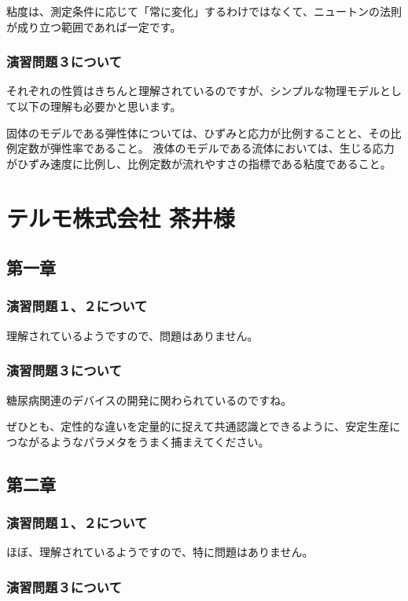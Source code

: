\documentclass[uplatex,dvipdfmx,a4paper,11pt]{jsreport}
\begin{document}
粘度は、測定条件に応じて「常に変化」するわけではなくて、ニュートンの法則が成り立つ範囲であれば一定です。

\subsubsection*{演習問題３について}
それぞれの性質はきちんと理解されているのですが、シンプルな物理モデルとして以下の理解も必要かと思います。

固体のモデルである弾性体については、ひずみと応力が比例することと、その比例定数が弾性率であること。
液体のモデルである流体においては、生じる応力がひずみ速度に比例し、比例定数が流れやすさの指標である粘度であること。

\clearpage

\section*{テルモ株式会社 茶井様}
\subsection*{第一章}
\subsubsection*{演習問題１、２について}
理解されているようですので、問題はありません。

\subsubsection*{演習問題３について}

糖尿病関連のデバイスの開発に関わられているのですね。

ぜひとも、定性的な違いを定量的に捉えて共通認識とできるように、安定生産につながるようなパラメタをうまく捕まえてください。

\subsection*{第二章}
\subsubsection*{演習問題１、２について}
ほぼ、理解されているようですので、特に問題はありません。

\subsubsection*{演習問題３について}
\end{document}
